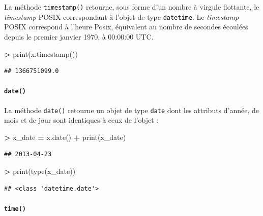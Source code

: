 \documentclass[12pt,]{book}
\newenvironment{Shaded}{\begin{snugshade}}{\end{snugshade}}
\newcommand{\OperatorTok}[1]{\textcolor[rgb]{0.81,0.36,0.00}{\textbf{#1}}}
\newcommand{\BuiltInTok}[1]{#1}
\newcommand{\NormalTok}[1]{#1}
\let\oldparagraph\paragraph
\renewcommand{\paragraph}[1]{\oldparagraph{#1}\mbox{}}
\numberwithin{equation}{section}
\numberwithin{countremarque}{section}
\begin{document}
La méthode \texttt{timestamp()} retourne, sous forme d'un nombre à
virgule flottante, le \emph{timestamp} POSIX correspondant à l'objet de
type \texttt{datetime}. Le \emph{timestamp} POSIX correspond à l'heure
Posix, équivalent au nombre de secondes écoulées depuis le premier
janvier 1970, à 00:00:00 UTC.

\begin{Shaded}
\begin{Highlighting}[]
\OperatorTok{>} \BuiltInTok{print}\NormalTok{(x.timestamp())}
\end{Highlighting}
\end{Shaded}

\begin{lstlisting}
## 1366751099.0
\end{lstlisting}

\paragraph{\texorpdfstring{\texttt{date()}}{date()}}\label{date}

La méthode \texttt{date()} retourne un objet de type \texttt{date} dont
les attributs d'année, de mois et de jour sont identiques à ceux de
l'objet :

\begin{Shaded}
\begin{Highlighting}[]
\OperatorTok{>}\NormalTok{ x_date }\OperatorTok{=}\NormalTok{ x.date()}
\OperatorTok{+} \BuiltInTok{print}\NormalTok{(x_date)}
\end{Highlighting}
\end{Shaded}

\begin{lstlisting}
## 2013-04-23
\end{lstlisting}

\begin{Shaded}
\begin{Highlighting}[]
\OperatorTok{>} \BuiltInTok{print}\NormalTok{(}\BuiltInTok{type}\NormalTok{(x_date))}
\end{Highlighting}
\end{Shaded}

\begin{lstlisting}
## <class 'datetime.date'>
\end{lstlisting}

\paragraph{\texorpdfstring{\texttt{time()}}{time()}}\label{time}
\end{document}
